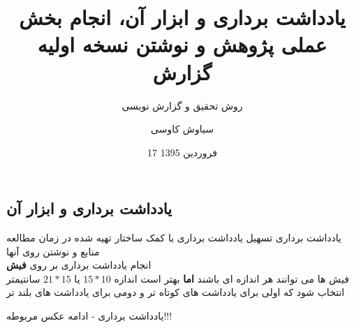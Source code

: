 \documentclass[14pt]{beamer}
\title{یادداشت برداری و ابزار آن، انجام بخش عملی پژوهش و نوشتن نسخه اولیه گزارش}
\subtitle{\color{brown} روش تحقیق و گزارش نویسی}
\date{17 فروردین 1395}
\author{سیاوش کاوسی}
\institute{دانشگاه صنعتی امیرکبیر}
\newcommand{\sectionfontsize}{\fontsize{22pt}{0pt}\selectfont}
\newcommand{\framefontsizelarge}{\fontsize{18pt}{0pt}\selectfont}
\newcommand{\frametitlefontsize}{\fontsize{20pt}{0pt}\selectfont}
\newcommand{\defaultvspace}{\vspace{5mm}}
\begin{document}
\begin{persian}
	\maketitle
	\everypar{\rightskip\rightmargin}		
	
	\section{\sectionfontsize یادداشت برداری و ابزار آن}	
	
	\begin{frame}{\frametitlefontsize یادداشت برداری}
		\framefontsizelarge
		تسهیل یادداشت برداری با کمک ساختار تهیه شده در زمان مطالعه منابع و نوشتن روی آنها \defaultvspace\\
		انجام یادداشت برداری بر روی \textbf{فیش}\defaultvspace\\
		فیش ها می توانند هر اندازه ای باشند  \textbf{اما} بهتر است اندازه  $15*10$ یا  $21*15$ سانتیمتر انتخاب شود که اولی برای یادداشت های کوتاه تر و دومی برای یادداشت های بلند تر
	\end{frame}	
	
	\begin{frame}{\frametitlefontsize یادداشت برداری - ادامه}
		\framefontsizelarge
		عکس مربوطه!!!
	\end{frame}	
	
\end{persian}
\end{document}
